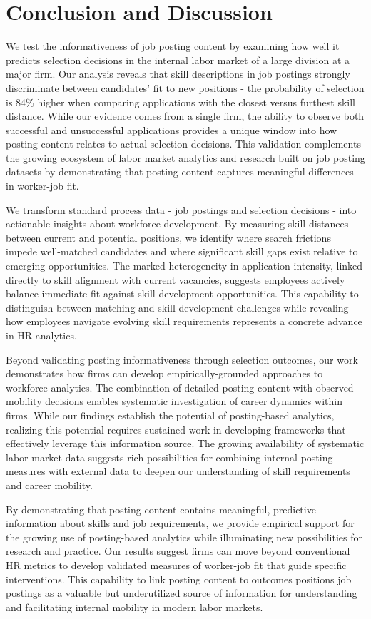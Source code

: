 \section{Conclusion and Discussion}\label{sec:conclusion_discussion}


We test the informativeness of job posting content by examining how well it predicts selection decisions in the internal 
labor market of a large division at a major firm. Our analysis reveals that skill descriptions in job postings strongly 
discriminate between candidates' fit to new positions - the probability of selection is 84\% higher when comparing 
applications with the closest versus furthest skill distance. While our evidence comes from a single firm, the ability 
to observe both successful and unsuccessful applications provides a unique window into how posting content relates to 
actual selection decisions. This validation complements the growing ecosystem of labor market analytics and research built 
on job posting datasets by demonstrating that posting content captures meaningful differences in worker-job fit.

We transform standard process data - job postings and selection decisions - into actionable insights about workforce 
development. By measuring skill distances between current and potential positions, we identify where search frictions 
impede well-matched candidates and where significant skill gaps exist relative to emerging opportunities. The marked 
heterogeneity in application intensity, linked directly to skill alignment with current vacancies, suggests employees 
actively balance immediate fit against skill development opportunities. This capability to distinguish between matching 
and skill development challenges while revealing how employees navigate evolving skill requirements represents a 
concrete advance in HR analytics.

Beyond validating posting informativeness through selection outcomes, our work demonstrates how firms can develop 
empirically-grounded approaches to workforce analytics. The combination of detailed posting content with observed 
mobility decisions enables systematic investigation of career dynamics within firms. While our findings establish 
the potential of posting-based analytics, realizing this potential requires sustained work in developing frameworks 
that effectively leverage this information source. The growing availability of systematic labor market data suggests 
rich possibilities for combining internal posting measures with external data to deepen our understanding of skill 
requirements and career mobility.

By demonstrating that posting content contains meaningful, predictive information about skills and job requirements, 
we provide empirical support for the growing use of posting-based analytics while illuminating new possibilities for 
research and practice. Our results suggest firms can move beyond conventional HR metrics to develop validated measures 
of worker-job fit that guide specific interventions. This capability to link posting content to outcomes positions 
job postings as a valuable but underutilized source of information for understanding and facilitating internal mobility 
in modern labor markets.

